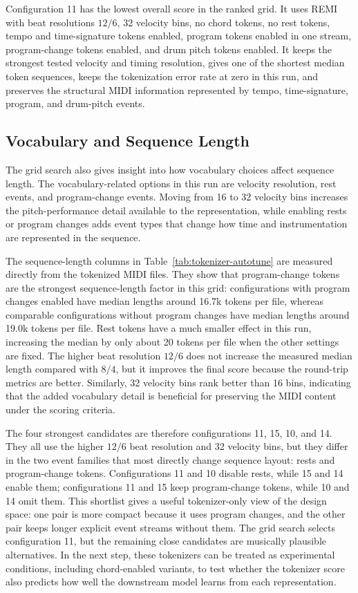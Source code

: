 Configuration 11 has the lowest overall score in the ranked grid. It uses REMI with beat resolutions \(12/6\), 32 velocity bins, no chord tokens, no rest tokens, tempo and time-signature tokens enabled, program tokens enabled in one stream, program-change tokens enabled, and drum pitch tokens enabled. It keeps the strongest tested velocity and timing resolution, gives one of the shortest median token sequences, keeps the tokenization error rate at zero in this run, and preserves the structural MIDI information represented by tempo, time-signature, program, and drum-pitch events.

\subsection{Vocabulary and Sequence Length}

The grid search also gives insight into how vocabulary choices affect sequence length. The vocabulary-related options in this run are velocity resolution, rest events, and program-change events. Moving from 16 to 32 velocity bins increases the pitch-performance detail available to the representation, while enabling rests or program changes adds event types that change how time and instrumentation are represented in the sequence.

The sequence-length columns in Table~\ref{tab:tokenizer-autotune} are measured directly from the tokenized MIDI files. They show that program-change tokens are the strongest sequence-length factor in this grid: configurations with program changes enabled have median lengths around 16.7k tokens per file, whereas comparable configurations without program changes have median lengths around 19.0k tokens per file. Rest tokens have a much smaller effect in this run, increasing the median by only about 20 tokens per file when the other settings are fixed. The higher beat resolution \(12/6\) does not increase the measured median length compared with \(8/4\), but it improves the final score because the round-trip metrics are better. Similarly, 32 velocity bins rank better than 16 bins, indicating that the added vocabulary detail is beneficial for preserving the MIDI content under the scoring criteria.

The four strongest candidates are therefore configurations 11, 15, 10, and 14. They all use the higher \(12/6\) beat resolution and 32 velocity bins, but they differ in the two event families that most directly change sequence layout: rests and program-change tokens. Configurations 11 and 10 disable rests, while 15 and 14 enable them; configurations 11 and 15 keep program-change tokens, while 10 and 14 omit them. This shortlist gives a useful tokenizer-only view of the design space: one pair is more compact because it uses program changes, and the other pair keeps longer explicit event streams without them. The grid search selects configuration 11, but the remaining close candidates are musically plausible alternatives. In the next step, these tokenizers can be treated as experimental conditions, including chord-enabled variants, to test whether the tokenizer score also predicts how well the downstream model learns from each representation.
